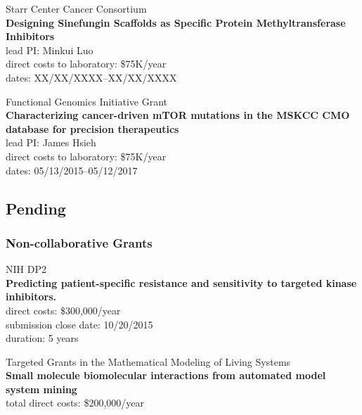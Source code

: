 \documentclass[10pt]{article}
\begin{document}
Starr Center Cancer Consortium\\
{\bf Designing Sinefungin Scaffolds as Specific Protein Methyltransferase Inhibitors}\\
lead PI: Minkui Luo \\
direct costs to laboratory: {\color{red}\$75K/year} \\
dates: {\color{red} XX/XX/XXXX--XX/XX/XXXX}

\vspace{2ex}

Functional Genomics Initiative Grant\\
{\bf Characterizing cancer-driven mTOR mutations in the MSKCC CMO database for precision therapeutics}\\
lead PI: James Hsieh\\
direct costs to laboratory: {\color{red}\$75K/year} \\
dates: 05/13/2015--05/12/2017

\eject
\subsection*{Pending}

\subsubsection*{Non-collaborative Grants}


\vspace{2ex}

\color{red}
NIH DP2\\
{\bf Predicting patient-specific resistance and sensitivity to targeted kinase inhibitors.}\\
direct costs: \$300,000/year\\
submission close date: 10/20/2015\\
duration: 5 years
\color{black}

\vspace{2ex}

Targeted Grants in the Mathematical Modeling of Living Systems\\
{\bf Small molecule biomolecular interactions from automated model system mining}\\
total direct costs: \$200,000/year\\
\end{document}
